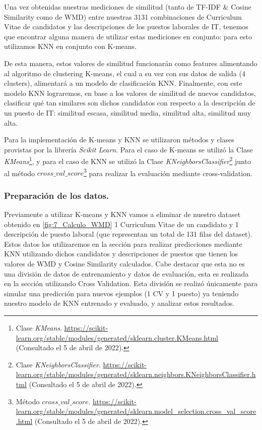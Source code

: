 \documentclass[12pt,a4paper]{article}
\begin{document}
\begin{sloppypar}
Una vez obtenidas nuestras mediciones de similitud (tanto de TF-IDF \& Cosine Similarity como de WMD) entre nuestras 3131 combinaciones de Curriculum Vitae de candidatos y las descripciones de los puestos laborales de IT, tenemos que encontrar alguna manera de utilizar estas mediciones en conjunto: para esto utilizamos KNN en conjunto con K-means.

De esta manera, estos valores de similitud funcionarán como features alimentando al algoritmo de clustering K-means, el cual a su vez con sus datos de salida (4 clusters), alimentará a un modelo de clasificación KNN. Finalmente, con este modelo KNN lograremos, en base a los valores de similitud de nuevos candidatos, clasificar qué tan similares son dichos candidatos con respecto a la descripción de un puesto de IT: similitud escasa, similitud media, similitud alta, similitud muy alta.

Para la implementación de K-means y KNN se utilizaron métodos y clases provistas por la librería \textit{Scikit Learn}. Para el caso de K-means se utilizó la Clase \textit{KMeans}\footnote{Clase \textit{KMeans}. \url{https://scikit-learn.org/stable/modules/generated/sklearn.cluster.KMeans.html} (Consultado el 5 de abril de 2022).}, y para el caso de KNN se utilizó la Clase \textit{KNeighborsClassifier}\footnote{Clase \textit{KNeighborsClassifier}. \url{https://scikit-learn.org/stable/modules/generated/sklearn.neighbors.KNeighborsClassifier.html} (Consultado el 5 de abril de 2022).} junto al método \textit{$cross\_val\_score$}\footnote{Método \textit{$cross\_val\_score$}. \url{https://scikit-learn.org/stable/modules/generated/sklearn.model_selection.cross_val_score.html} (Consultado el 5 de abril de 2022).} para realizar la evaluación mediante cross-validation. \\

\subsubsection{Preparación de los datos.}\label{prep_datosd}

Previamente a utilizar K-means y KNN vamos a eliminar de nuestro dataset obtenido en \ref{fig:7_Calculo_WMD} 1 Curriculum Vitae de un candidato y 1 descripción de puesto laboral (que representan un total de 131 filas del dataset). Estos datos los utilizaremos en la sección \textit{} para realizar predicciones mediante KNN utilizando dichos candidatos y descripciones de puestos que tienen los valores de WMD y Cosine Similarity calculados. Cabe destacar que esta no es una división de datos de entrenamiento y datos de evaluación, esta es realizada en la sección \textit{} utilizando Cross Validation. Esta división se realizó únicamente para simular una predicción para nuevos ejemplos (1 CV y 1 puesto) ya teniendo nuestro modelo de KNN entrenado y evaluado, y analizar estos resultados. 


\end{sloppypar}
\end{document}
